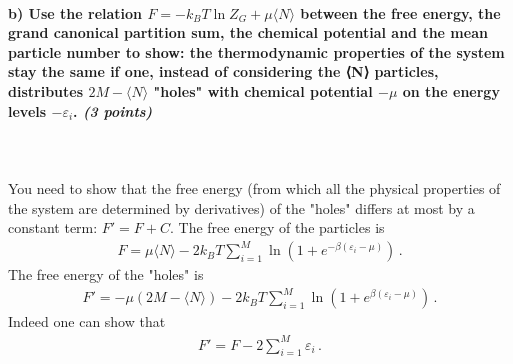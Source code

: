 \paragraph{b) Use the relation $F=-k_BT\ln Z_G+\mu\langle N\rangle$
    between the free energy, the grand canonical partition 
    sum, the chemical potential and the mean particle number 
    to show: the thermodynamic properties of the system stay 
    the same if one, instead of considering the 
    ⟨N⟩ particles, distributes $2M-\langle N\rangle$ 
    "holes" with chemical potential $-\mu$ on the energy levels
    $-\varepsilon_i$.
    \textit{(3 points)}
} \ \\
\\
You need to show that the free energy (from which all the physical properties 
of the system are determined by derivatives) of the "holes" differs at most by
a constant term: $F' = F + C$.
The free energy of the particles is
\begin{align}
	F = \mu\langle N\rangle - 2k_BT \sum_{i=1}^M \ln\left( 1+e^{-\beta(\varepsilon_i-\mu)} \right) \,.
\end{align}
The free energy of the "holes" is
\begin{align}
	F' = -\mu(2M-\langle N\rangle) - 2k_BT \sum_{i=1}^M \ln\left( 1+e^{\beta(\varepsilon_i-\mu)} \right) \,.
\end{align}
Indeed one can show that
\begin{align}
	F' = F - 2\sum_{i=1}^M \varepsilon_i \,.
\end{align}